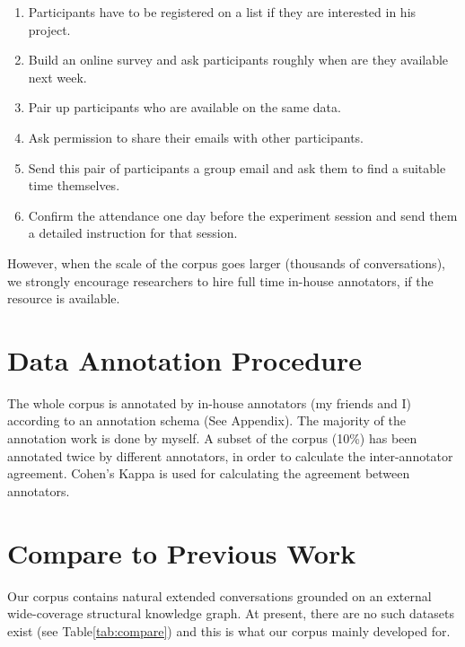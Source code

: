 \documentclass[bsc,frontabs,twoside,singlespacing,parskip,deptreport]{infthesis}     %
\begin{document}
\begin{enumerate}

    \item Participants have to be registered on a list if they are interested in his project.

   \item Build an online survey and ask participants roughly when are they available next week.

   \item Pair up participants who are available on the same data.
 
   \item Ask permission to share their emails with other participants.
   
    \item Send this pair of participants a group email and ask them to find a suitable time themselves.

    \item Confirm the attendance one day before the experiment session and send them a detailed instruction for that session.
    
\end{enumerate}

However, when the scale of the corpus goes larger (thousands of conversations), we strongly encourage researchers to hire full time in-house annotators, if the resource is available.

\section{Data Annotation Procedure}

The whole corpus is annotated by in-house annotators (my friends and I) according to an annotation schema (See Appendix). The majority of the annotation work is done by myself. A subset of the corpus (10\%) has been annotated twice by different annotators, in order to calculate the inter-annotator agreement. Cohen's Kappa is used for calculating the agreement between annotators.

\section{Compare to Previous Work}

Our corpus contains natural extended conversations grounded on an external wide-coverage structural knowledge graph. At present, there are no such datasets exist (see Table\ref{tab:compare}) and this is what our corpus mainly developed for.
\end{document}
